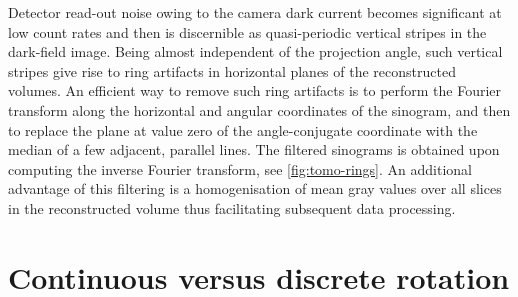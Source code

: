 \documentclass[
twoside,
openright,
titlepage,
numbers=noenddot,
headinclude,
fleqn,
a4paper,
footinclude=true,
cleardoublepage=empty,
abstractoff,
BCOR=5mm,
paper=a4,
fontsize=11pt,
british,ngerman,american,
]{scrreprt}
\begin{document}
Detector read-out noise owing to the camera dark current becomes
significant at low count rates and then is discernible as
quasi-periodic vertical stripes in the dark-field image.  Being almost
independent of the projection angle, such vertical stripes give rise
to ring artifacts in horizontal planes of the reconstructed volumes.
An efficient way to remove such ring artifacts is to perform the
Fourier transform along the horizontal and angular coordinates of the
sinogram, and then to replace the plane at value zero of the
angle-conjugate coordinate with the median of a few adjacent, parallel
lines.  The filtered sinograms is obtained upon computing the inverse
Fourier transform, see \cref{fig:tomo-rings}.  An additional advantage
of this filtering is a homogenisation of mean gray values over all
slices in the reconstructed volume thus facilitating subsequent data
processing.

\section{Continuous versus discrete rotation}
\label{sec:cont-step}
\end{document}
